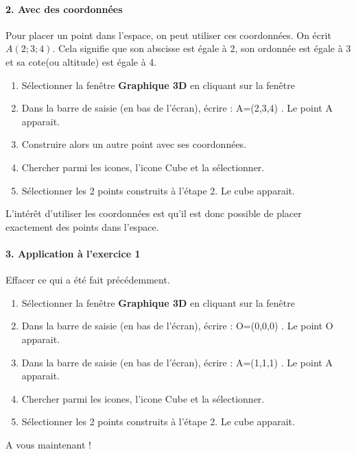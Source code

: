 \documentclass{article}
\begin{document}
\paragraph{2. Avec des coordonnées}
 
\begin{minipage}{0.73\linewidth}
Pour placer un point dans l'espace, on peut utiliser ces coordonnées. On écrit $A(2;3;4)$. Cela signifie que son abscisse est égale à  2, son ordonnée est égale à  3 et sa cote(ou altitude) est égale à 4.

\begin{enumerate}
\item Sélectionner la fenêtre \textbf{Graphique 3D} en cliquant sur la fenêtre
\item Dans la barre de saisie (en bas de l'écran), écrire :  A=(2,3,4)  . Le point A apparait.
\item Construire alors un autre point avec ses coordonnées. 
\item Chercher parmi les icones, l'icone Cube et la sélectionner. 
\item Sélectionner les 2 points construits à l'étape 2. Le cube apparait.
\end{enumerate}
\end{minipage}
\hfill
\begin{minipage}{0.25\linewidth}
\begin{Rq}
L'intérêt d'utiliser les coordonnées est qu'il est donc possible de placer exactement des points dans l'espace.
\end{Rq}
 \end{minipage}
 
 
\paragraph{3. Application à l'exercice 1}

\begin{minipage}{0.23\linewidth}
\begin{Rq}
Effacer ce qui a été fait précédemment.
\end{Rq}
\end{minipage}
\hfill
\begin{minipage}{0.71\linewidth}
\begin{enumerate}
\item Sélectionner la fenêtre \textbf{Graphique 3D} en cliquant sur la fenêtre
\item Dans la barre de saisie (en bas de l'écran), écrire :  O=(0,0,0)  . Le point O apparait.
\item Dans la barre de saisie (en bas de l'écran), écrire :  A=(1,1,1)  . Le point A apparait. 
\item Chercher parmi les icones, l'icone Cube et la sélectionner. 
\item Sélectionner les 2 points construits à l'étape 2. Le cube apparait.
\end{enumerate}

A vous maintenant !
\end{minipage}
\end{document}
